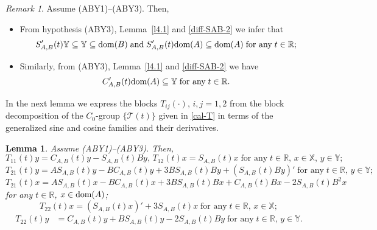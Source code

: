 \documentclass[11pt]{amsart}
\numberwithin{equation}{section}
\newcommand{\SAB}{S_{A,B}}
\newcommand{\CAB}{C_{A,B}}
\newtheorem{lemma}[theorem]{Lemma}
\theoremstyle{remark}
\newtheorem{remark}[theorem]{Remark}
\theoremstyle{definition}
\newcommand\cT{{\mathcal T}}
\newcommand\bX{{\mathbb X}}
\newcommand\bY{{\mathbb Y}}
\newcommand{\dom}{\text{\rm{dom}}}
\begin{document}
\begin{remark}\label{r4.4}
	Assume \textnormal{(ABY1)--(ABY3)}. Then, 
	\begin{itemize}
		\item[(i)] From hypothesis (ABY3), Lemma~\ref{l4.1} and \eqref{diff-SAB-2} we infer that 
		\begin{equation}\label{r4.4.1}
			\SAB'(t)\bY\subseteq\bY \subseteq \dom(B)\;\mbox{and}\; \SAB'(t)\dom(A) \subseteq \dom(A)\;\mbox{for any}\; t \in \mathbb{R};
		\end{equation}	
		\item[(ii)] Similarly, from (ABY3), Lemma~\ref{l4.1} and \eqref{diff-SAB-2} we have
		\begin{equation}\label{r4.4.2}
			\CAB'(t)\dom(A) \subseteq \bY\;\mbox{for any}\; t \in \mathbb{R}.
		\end{equation}	
	\end{itemize}	
\end{remark}	
In the next lemma we express the blocks $T_{ij}(\cdot)$, $i,j = 1,2$ from the block decomposition of the $C_0$-group $\{\cT(t)\}$ given in \eqref{cal-T} in terms of the generalized sine and cosine families and their derivatives.
\begin{lemma}\label{4.4}
	Assume \textnormal{(ABY1)--(ABY3)}. Then,
	\begin{equation}\label{cT-row 1}
		T_{11}(t)y= \CAB(t)y - \SAB(t)By,\, T_{12}(t)x = \SAB(t)x \;\text{for any}\; t \in \mathbb{R},\, x\in\bX,\, y \in \bY;
	\end{equation}
	\begin{equation}\label{T21-Y}
		T_{21}(t)y= A\SAB(t)y - BC_{A,B}(t)y + 3B\SAB(t)By + (\SAB(t)By)' \; \text{for any}\; t \in \mathbb{R},\, y \in \bY;
	\end{equation}
	\begin{equation}\label{T21-X}
		T_{21}(t)x= A\SAB(t)x - BC_{A,B}(t)x + 3B\SAB(t)Bx 
		+ \CAB(t)Bx - 2\SAB(t)B^2x
	\end{equation}
	for any $t \in \mathbb{R}$, $x \in \dom(A)$;
	\begin{equation}\label{T22-X}
		T_{22}(t)x = (\SAB(t)x)' + 3\SAB(t)x \;\text{for any}\; t \in \mathbb{R},\, x\in\bX;
	\end{equation}
	\begin{align}\label{T22-Y}
		T_{22}(t)y &= \CAB(t)y + B\SAB(t)y - 2\SAB(t)By 
		\;\text{for any}\;  t \in \mathbb{R},\, y \in \bY. 
	\end{align}
\end{lemma}
\end{document}
